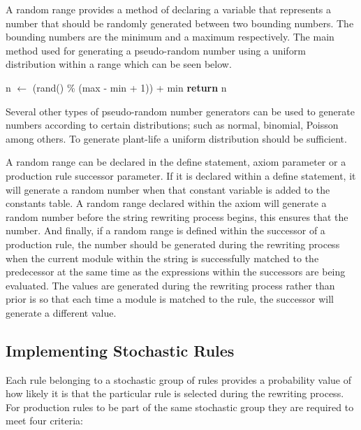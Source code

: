 A random range provides a method of declaring a variable that represents a number that should be randomly generated between two bounding numbers. The bounding numbers are the minimum and a maximum respectively. The main method used for generating a pseudo-random number using a uniform distribution within a range which can be seen below. 

\begin{singlespace}
\begin{algorithm}
\begin{algorithmic}[1]
	\State n $\gets$ (rand() \% (max - min + 1)) + min
	\State \textbf{return} n
\EndProcedure
\end{algorithmic}
\end{algorithm}
\end{singlespace}

\noindent
Several other types of pseudo-random number generators can be used to generate numbers according to certain distributions; such as normal, binomial, Poisson among others. To generate plant-life a uniform distribution should be sufficient.

A random range can be declared in the define statement, axiom parameter or a production rule successor parameter. If it is declared within a define statement, it will generate a random number when that constant variable is added to the constants table. A random range declared within the axiom will generate a random number before the string rewriting process begins, this ensures that the number. And finally, if a random range is defined within the successor of a production rule, the number should be generated during the rewriting process when the current module within the string is successfully matched to the predecessor at the same time as the expressions within the successors are being evaluated. The values are generated during the rewriting process rather than prior is so that each time a module is matched to the rule, the successor will generate a different value.

\subsection{Implementing Stochastic Rules} \label{stochastic rules}

Each rule belonging to a stochastic group of rules provides a probability value of how likely it is that the particular rule is selected during the rewriting process. For production rules to be part of the same stochastic group they are required to meet four criteria: 

